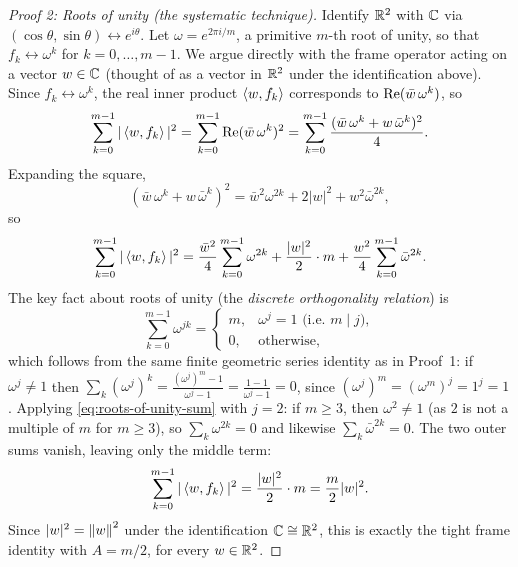 \begin{proof}[Proof 2: Roots of unity (the systematic technique)]
Identify $\mathbb{R}^2$ with $\mathbb{C}$ via $(\cos\theta,\sin\theta)\leftrightarrow
e^{i\theta}$. Let $\omega = e^{2\pi i/m}$, a primitive $m$-th root of
unity, so that $f_k \leftrightarrow \omega^k$ for $k=0,\ldots,m-1$. We
argue directly with the frame operator acting on a vector $w \in \mathbb{C}$
(thought of as a vector in $\mathbb{R}^2$ under the identification above). Since
$f_k\leftrightarrow\omega^k$, the real inner product
$\left\langle w, f_k \right\rangle$ corresponds to $\operatorname{Re}(\bar w\,\omega^k)$, so
\[
  \sum_{k=0}^{m-1}|\left\langle w, f_k \right\rangle|^2
  = \sum_{k=0}^{m-1}\operatorname{Re}(\bar w\,\omega^k)^2
  = \sum_{k=0}^{m-1}\frac{(\bar w\,\omega^k+w\,\bar\omega^k)^2}{4}.
\]
Expanding the square,
\[
  (\bar w\,\omega^k+w\,\bar\omega^k)^2
  = \bar w^2\omega^{2k} + 2|w|^2 + w^2\bar\omega^{2k},
\]
so
\[
  \sum_{k=0}^{m-1}|\left\langle w, f_k \right\rangle|^2
  = \frac{\bar w^2}{4}\sum_{k=0}^{m-1}\omega^{2k}
  + \frac{|w|^2}{2}\cdot m
  + \frac{w^2}{4}\sum_{k=0}^{m-1}\bar\omega^{2k}.
\]
The key fact about roots of unity (the \emph{discrete orthogonality
relation}) is
\begin{equation}
\label{eq:roots-of-unity-sum}
  \sum_{k=0}^{m-1} \omega^{jk} =
  \begin{cases}
    m, & \omega^j = 1 \text{ (i.e.\ } m \mid j), \\
    0, & \text{otherwise},
  \end{cases}
\end{equation}
which follows from the same finite geometric series identity as in
Proof~1: if $\omega^j\ne1$ then
$\sum_k(\omega^j)^k=\frac{(\omega^j)^m-1}{\omega^j-1}=\frac{1-1}{\omega^j-1}=0$,
since $(\omega^j)^m=(\omega^m)^j=1^j=1$. Applying
\eqref{eq:roots-of-unity-sum} with $j=2$: if $m\ge 3$, then $\omega^2\ne
1$ (as $2$ is not a multiple of $m$ for $m\ge3$), so $\sum_k\omega^{2k}=0$
and likewise $\sum_k\bar\omega^{2k}=0$. The two outer sums vanish, leaving
only the middle term:
\[
  \sum_{k=0}^{m-1}|\left\langle w, f_k \right\rangle|^2 = \frac{|w|^2}{2}\cdot m = \frac{m}{2}|w|^2.
\]
Since $|w|^2 = \left\| w \right\|^2$ under the identification $\mathbb{C}\cong\mathbb{R}^2$, this is
exactly the tight frame identity with $A=m/2$, for every $w\in\mathbb{R}^2$.
\end{proof}

